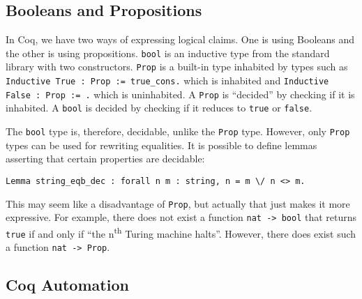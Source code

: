 \subsection{Booleans and Propositions}
In Coq, we have two ways of expressing logical claims. One is using Booleans and the other is using propositions. 
\lstinline{bool} is an inductive type from the standard library with two constructors. \lstinline{Prop} is a built-in
type inhabited by types such as \lstinline{Inductive True : Prop := true_cons.} which is inhabited and
\lstinline{Inductive False : Prop := .} which is uninhabited. A \lstinline{Prop} is ``decided'' by checking
if it is inhabited. A \lstinline{bool} is decided by checking if it reduces to \lstinline{true} or
\lstinline{false}.

The \lstinline{bool} type is, therefore, decidable, unlike the \lstinline{Prop} type. However, only \lstinline{Prop}
types can be used for rewriting equalities. It is possible to define lemmas asserting that certain properties
are decidable:
\begin{lstlisting}
Lemma string_eqb_dec : forall n m : string, n = m \/ n <> m.
\end{lstlisting}

This may seem like a disadvantage of \lstinline{Prop}, but actually that just makes it more expressive. For example,
there does not exist a function \lstinline{nat -> bool} that returns \lstinline{true} if and only if 
``the n\textsuperscript{th} Turing machine halts''. However, there does exist such a function \lstinline{nat -> Prop}.


\subsection{Coq Automation}


